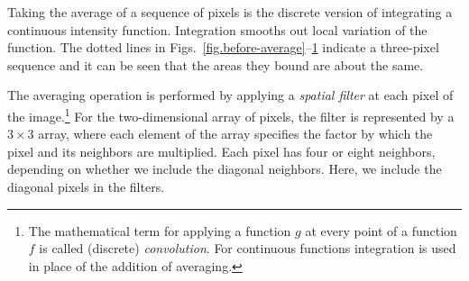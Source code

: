 \begin{figure}
\subfigures
\begin{minipage}{\textwidth}
\hspace{\fill}
\label{fig.before-average}
\label{fig.after-average}
\end{minipage}
\end{figure}

Taking the average of a sequence of pixels is the discrete version of integrating a continuous intensity function. Integration smooths out local variation of the function. The dotted lines in Figs.~\ref{fig.before-average}--\ref{fig.after-average} indicate a three-pixel sequence and it can be seen that the areas they bound are about the same.

The averaging operation is performed by applying a \emph{spatial filter} at each pixel of the image.\footnote{The mathematical term for applying a function $g$ at every point of a function $f$ is called (discrete) \emph{convolution}. For continuous functions integration is used in place of the addition of averaging.} For the two-dimensional array of pixels, the filter is represented by a $3\times 3$ array, where each element of the array specifies the factor by which the pixel and its neighbors are multiplied. Each pixel has four or eight neighbors, depending on whether we include the diagonal neighbors. Here, we include the diagonal pixels in the filters.

